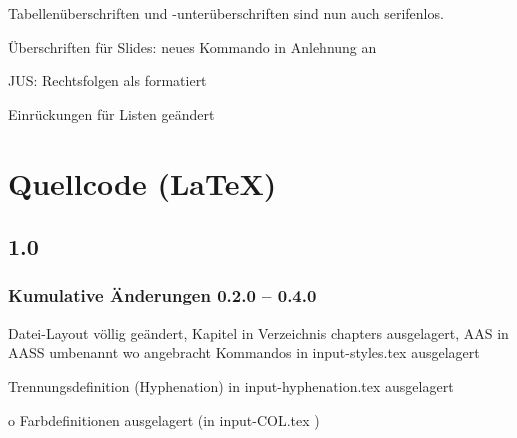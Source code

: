 \documentclass[ngerman,a4paper,fontsize=9pt,BCOR=0cm,DIV=11,headings=big,draft=no]{scrreprt}
\begin{document}
Tabellenüberschriften und
          -unterüberschriften sind nun auch serifenlos.

Überschriften für Slides:
          neues Kommando  in Anlehnung
          an 

          JUS: Rechtsfolgen als
 formatiert

Einrückungen für Listen geändert

\chapter{Quellcode (\LaTeX)}



\section{1.0}


\subsection{Kumulative Änderungen 0.2.0 -- 0.4.0}

Datei-Layout völlig
geändert, Kapitel in Verzeichnis chapters ausgelagert, AAS in AASS umbenannt wo angebracht Kommandos in input-styles.tex ausgelagert

Trennungsdefinition
(Hyphenation) in input-hyphenation.tex ausgelagert

          o Farbdefinitionen
          ausgelagert (in input-COL.tex )

\end{document}
